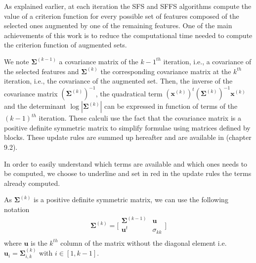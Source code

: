 \documentclass[a4paper,11pt,DIV=16,abstracton]{scrartcl}
\begin{document}
        As explained earlier, at each iteration the SFS and SFFS algorithms compute the value of a criterion function for every possible set of features composed of the selected ones augmented by one of the remaining features. One of the main achievements of this work is to reduce the computational time needed to compute the criterion function of augmented sets.

        We note $\boldsymbol{\Sigma}^{(k-1)}$ a covariance matrix of the $k-1^{th}$ iteration, i.e., a covariance of the selected features and $\boldsymbol{\Sigma}^{(k)}$ the corresponding covariance matrix at the $k^{th}$ iteration, i.e., the covariance of the augmented set. Then, the inverse of the covariance matrix $(\boldsymbol{\Sigma}^{(k)})^{-1}$, the quadratical term $(\mathbf{x}^{(k)})^t (\boldsymbol{\Sigma}^{(k)})^{-1} \mathbf{x}^{(k)}$ and the determinant $\log |\boldsymbol{\Sigma}^{(k)}|$ can be expressed in function of terms of the $(k-1)^{th}$ iteration. These calculi use the fact that the covariance matrix is a positive definite symmetric matrix to simplify formulae using matrices defined by blocks. These update rules are summed up hereafter and are available in \cite{webb2003statistical} (chapter 9.2).

        In order to easily understand which terms are available and which ones needs to be computed, we choose to underline and set in red in the update rules the terms already computed.

        As $\boldsymbol{\Sigma}^{(k)}$ is a positive definite symmetric matrix, we can use the following notation
        \begin{equation*}
            \boldsymbol{\Sigma}^{(k)} =
            \bigg[\begin{array}{cc}
            \boldsymbol{\Sigma}^{(k-1)} & \mathbf{u}      \\
            \mathbf{u}^t          & \sigma_{kk} \\
            \end{array}\bigg]
        \end{equation*}
        where $\mathbf{u}$ is the $k^{th}$ column of the matrix without the diagonal element i.e. $\mathbf{u}_{i} = \boldsymbol{\Sigma}^{(k)}_{i,k}$ with $i \in [1,k-1]$.
\end{document}
